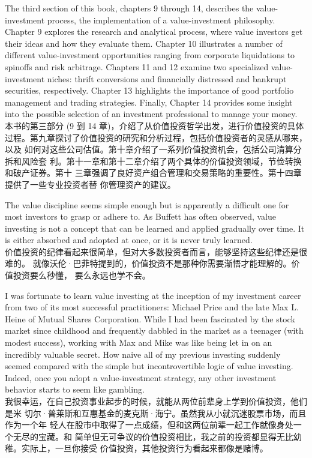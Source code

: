 \begin{verseparallel}
  {
    The third section of this book, chapters 9 through 14, describes the
    value-investment process, the implementation of a value-investment
    philosophy. Chapter 9 explores the research and analytical process, where
    value investors get their ideas and how they evaluate them. Chapter 10
    illustrates a number of different value-investment opportunities ranging
    from corporate liquidations to spinoffs and risk arbitrage. Chapters 11 and
    12 examine two specialized value-investment niches: thrift conversions and
    financially distressed and bankrupt securities, respectively. Chapter 13
    highlights the importance of good portfolio management and trading
    strategies. Finally, Chapter 14 provides some insight into the possible
    selection of an investment professional to manage your money. \\
  }
  {
    本书的第三部分{} (9 到 14 章)，介绍了从价值投资哲学出发，进行价值投资的具体
    过程。第九章探讨了价值投资的研究和分析过程，包括价值投资者的灵感从哪来，以及
    如何对这些公司估值。第十章介绍了一系列价值投资机会，包括公司清算分拆和风险套
    利。第十一章和第十二章介绍了两个具体的价值投资领域，节俭转换和破产证券。第十
    三章强调了良好资产组合管理和交易策略的重要性。第十四章提供了一些专业投资者替
    你管理资产的建议。
  }
\end{verseparallel}
\begin{verseparallel}
  {
    The value discipline seems simple enough but is apparently a difficult one
    for most investors to grasp or adhere to. As Buffett has often observed,
    value investing is not a concept that can be learned and applied gradually
    over time. It is either absorbed and adopted at once, or it is never truly
    learned. \\
  }
  {
    价值投资的纪律看起来很简单，但对大多数投资者而言，能够坚持这些纪律还是很难的。
    就像沃伦·巴菲特提到的，价值投资不是那种你需要渐悟才能理解的。价值投资要么秒懂，
    要么永远也学不会。
  }
\end{verseparallel}
\begin{verseparallel}
  {
    I was fortunate to learn value investing at the inception of my investment
    career from two of its most successful practitioners: Michael Price and the
    late Max L. Heine of Mutual Shares Corporation. While I had been fascinated
    by the stock market since childhood and frequently dabbled in the market as
    a teenager (with modest success), working with Max and Mike was like being
    let in on an incredibly valuable secret. How naive all of my previous
    investing suddenly seemed compared with the simple but incontrovertible
    logic of value investing. Indeed, once you adopt a value-investment
    strategy, any other investment behavior starts to seem like gambling. \\
  }
  {
    我很幸运，在自己投资事业起步的时候，就能从两位前辈身上学到价值投资，他们是米
    切尔·普莱斯和互惠基金的麦克斯·海宁。虽然我从小就沉迷股票市场，而且作为一个年
    轻人在股市中取得了一点成绩，但和这两位前辈一起工作就像身处一个无尽的宝藏。和
    简单但无可争议的价值投资相比，我之前的投资都显得无比幼稚。实际上，一旦你接受
    价值投资，其他投资行为看起来都像是赌博。
  }
\end{verseparallel}
